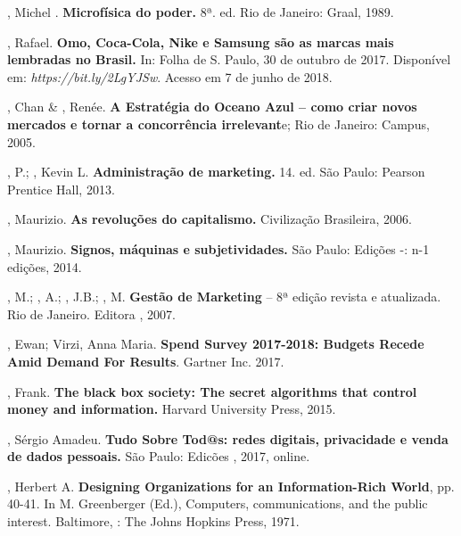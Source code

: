 , Michel . \textbf{Microfísica do poder.} 8ª. ed. Rio de
Janeiro: Graal, 1989.

, Rafael. \textbf{Omo, Coca-Cola, Nike e Samsung são as marcas
mais lembradas no Brasil.} In: Folha de S. Paulo, 30 de outubro de 2017.
Disponível em: \emph{https://bit.ly/2LgYJSw}. Acesso em 7 de junho de 2018.

, Chan \& , Renée. \textbf{A Estratégia do Oceano Azul --
como criar novos mercados e tornar a concorrência irrelevant}e; Rio de
Janeiro: Campus, 2005.

, P.; , Kevin L. \textbf{Administração de marketing.} 14.
ed. São Paulo: Pearson Prentice Hall, 2013.

, Maurizio. \textbf{As revoluções do capitalismo.} Civilização
Brasileira, 2006.

, Maurizio. \textbf{Signos, máquinas e subjetividades.} São
Paulo: Edições -: n-1 edições, 2014.

, M.; , A.; , J.B.; , M. \textbf{Gestão de
Marketing} -- 8ª edição revista e atualizada. Rio de Janeiro. Editora
, 2007.

, Ewan; Virzi, Anna Maria. \textbf{ Spend Survey 2017-2018:
Budgets Recede Amid Demand For Results}. Gartner Inc. 2017.

, Frank. \textbf{The black box society: The secret algorithms
that control money and information.} Harvard University Press, 2015.

, Sérgio Amadeu. \textbf{Tudo Sobre Tod@s: redes digitais,
privacidade e venda de dados pessoais.} São Paulo: Edicões , 2017,
online.

, Herbert A. \textbf{Designing Organizations for an
Information-Rich World}, pp. 40-41. In M. Greenberger (Ed.), Computers,
communications, and the public interest. Baltimore, : The Johns
Hopkins Press, 1971.
